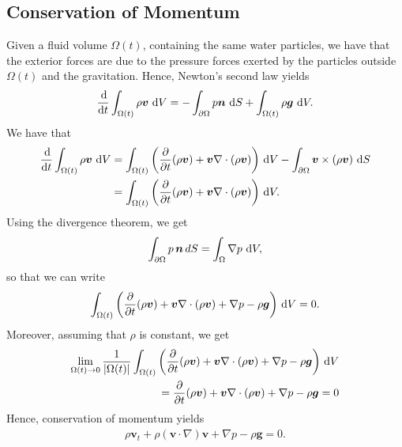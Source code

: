 \documentclass[12pt]{article}
\begin{document}
\subsection*{Conservation of Momentum}
Given a fluid volume $\Omega(t)$, containing the same water particles, we have that the exterior forces are
due to the pressure forces exerted by the particles outside $\Omega(t)$ and the gravitation. Hence, Newton's second
law yields
\begin{align*}
    \frac{\operatorname{d}\! }{\operatorname{d}\! t}\int_{\Omega(t)}\rho \bm{v} \, \operatorname{d}\! V = -\int_{\partial \Omega} p \bm{n} \, \operatorname{d}\! S + \int_{\Omega(t)} \rho \bm{g} \, \operatorname{d}\! V.
\end{align*}
We have that
\begin{align*}
	\begin{aligned}
	    \frac{\operatorname{d}\!}{\operatorname{d}\! t} \int_{\Omega(t)} \rho \bm{v} \, \operatorname{d}\! V 
	        & = \int_{\Omega(t)} \bigg(\frac{\partial}{\partial t}(\rho \bm{v})
	                + \bm{v} \nabla \cdot (\rho \bm{v}) \bigg) \, \operatorname{d}\! V
	                - \int_{\partial \Omega} \bm{v} \times (\rho \bm{v}) \, \operatorname{d}\! S \\
	        & = \int_{\Omega(t)} \bigg(\frac{\partial}{\partial t}(\rho \bm{v})
	                + \bm{v} \nabla \cdot (\rho \bm{v}) \bigg) \, \operatorname{d}\! V.           
	\end{aligned}
\end{align*}
Using the divergence theorem, we get
\begin{align*}
    \int_{\partial \Omega} p \, \bm{n} \, d S = \int_{\Omega} \nabla p \, \operatorname{d}\! V,
\end{align*}
so that we can write
\begin{align*}
    \int_{\Omega(t)} \bigg(\frac{\partial}{\partial t}(\rho \bm{v})
	                + \bm{v} \nabla \cdot (\rho \bm{v}) + \nabla p - \rho \bm{g} \bigg) \, \operatorname{d}\! V = 0.
\end{align*}
Moreover, assuming that $\rho$ is constant, we get
\begin{align*}
    \lim_{\Omega(t) \rightarrow 0} \frac{1}{|\Omega(t)|}\int_{\Omega(t)} \bigg(\frac{\partial}{\partial t}(\rho \bm{v})
	                + \bm{v} \nabla \cdot (\rho \bm{v}) + \nabla p - \rho \bm{g} \bigg) \, \operatorname{d}\! V \\
	                = \frac{\partial}{\partial t}(\rho \bm{v})
	                + \bm{v} \nabla \cdot (\rho \bm{v}) + \nabla p - \rho \bm{g} = 0
\end{align*}
Hence, conservation of momentum yields
\begin{align}
    \label{eq:momentumConservation}
    \rho \bm{v}_t + \rho(\bm{v} \cdot \nabla) \bm{v} + \nabla p - \rho \bm{g} = 0.
\end{align}
%
%
\end{document}
